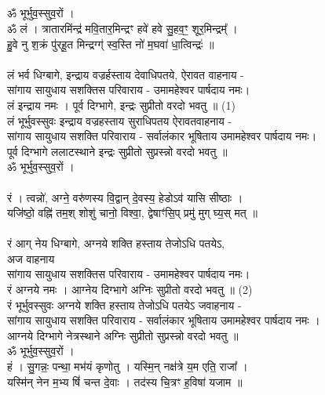 \subsection{}
ॐ भूर्भुव॒स्सुव॒रों ।\\
ॐ लं । त्रातारमिंन्द्र॑ मवि॒तार॒मिन्द्रꣳ हवे॑ हवे सु॒हव॒ꣳ॒ शूर॒मिन्द्रम्᳚ । \\
हु॒वे नु श॒क्रं पु॑रहू॒त मिन्द्रग्ग्॑ स्व॒स्ति नो॑ म॒घवा॑ धा॒त्विन्द्रः॑ ॥\\
\\
लं भर्व धिग्बागे, इन्द्राय वज्रर्हस्ताय देवाधिपतये, ऐरावत वाहनाय - \\
सांगाय सायुधाय सशक्तिस परिवाराय -  उमामहेश्वर पार्षदाय नमः।\\
लं इन्द्राय नमः ।  पूर्व दिग्भागे, इन्द्रः सुप्रीतो  वरदो भवतु ॥  (1)\\
{\small लं भूर्भुवस्सुवः इन्द्राय वज्रहस्ताय सुराधिपतय ऐरावतवाहनाय -\\
सांगाय सायुधाय सशक्ति परिवाराय - सर्वालंकार भूषिताय उमामहेश्वर पार्षदाय नमः।\\
पूर्व दिग्भागे ललाटस्थाने इन्द्रः सुप्रीतो सुप्रस्न्नो वरदो भवतु ॥}\\
ॐ भूर्भुव॒स्सुव॒रों ।\\
\\
रं । त्वन्नो॑, अग्ने॒ वरु॑णस्य वि॒द्वान् दे॒वस्य॒ हेडोऽव॑ यासि सीष्ठाः ।\\
यजि॑ष्ठो॒  वह्नि॑ तम॒श् शोशु॑ चानो॒ विश्वा॒, द्वेषाꣳ॑सि॒प् प्रमु॑ मुग् घ्य॒स् मत् ॥ \\
\\
रं आग् नेय धिग्बागे, अग्नये शक्ति हस्ताय तेजोऽधि पतयेऽ,\\
\hspace*{10cm} अज वाहनाय\\
सांगाय सायुधाय सशक्तिस परिवाराय - उमामहेश्वर पार्षदाय नमः।\\
रं अग्नये नमः । आग्नेय दिग्भागे अग्निः सुप्रीतो  वरदो भवतु ॥ (2)\\
{\small रं भूर्भुवस्सुवः अग्नये शक्ति हस्ताय तेजोऽधि पतयेऽ जवाहनाय -\\
सांगाय सायुधाय सशक्ति परिवाराय - सर्वालंकार भूषिताय उमामहेश्वर पार्षदाय नमः ।\\
आग्नये दिग्भागे नेत्रस्थाने अग्निः सुप्रीतो सुप्रस्न्नो वरदो भवतु ॥}\\
ॐ भूर्भुव॒स्सुव॒रों ।\\
हं । सु॒गन्नः॒ पन्था॒ मभ॑यं कृणोतु । यस्मि॒न् नक्ष॑त्रे य॒म एति॒ राजा᳚ ।\\
यस्मि॑न् नेन म॒भ्य षिं॑ चन्त दे॒वाः । तद॑स्य चि॒त्रꣳ ह॒विषा॑ यजाम ॥\\
